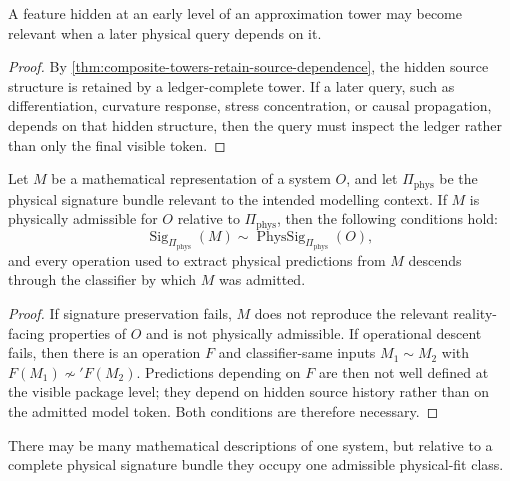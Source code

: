 \begin{corollary}
\label{cor:hidden-source-structure-physically-active}
A feature hidden at an early level of an approximation tower may become relevant when a later physical query depends on it.
\end{corollary}

\begin{proof}
By \autoref{thm:composite-towers-retain-source-dependence}, the hidden source structure is retained by a ledger-complete tower. If a later query, such as differentiation, curvature response, stress concentration, or causal propagation, depends on that hidden structure, then the query must inspect the ledger rather than only the final visible token.
\end{proof}

\begin{theorem}
\label{thm:physical-admissibility-signature-descent}
Let $M$ be a mathematical representation of a system $O$, and let $\Pi_{\mathrm{phys}}$ be the physical signature bundle relevant to the intended modelling context. If $M$ is physically admissible for $O$ relative to $\Pi_{\mathrm{phys}}$, then the following conditions hold:
$$
\operatorname{Sig}_{\Pi_{\mathrm{phys}}}(M)
\sim
\operatorname{PhysSig}_{\Pi_{\mathrm{phys}}}(O),
$$
and every operation used to extract physical predictions from $M$ descends through the classifier by which $M$ was admitted.
\end{theorem}

\begin{proof}
If signature preservation fails, $M$ does not reproduce the relevant reality-facing properties of $O$ and is not physically admissible. If operational descent fails, then there is an operation $F$ and classifier-same inputs $M_1\sim M_2$ with $F(M_1)\not\sim'F(M_2)$. Predictions depending on $F$ are then not well defined at the visible package level; they depend on hidden source history rather than on the admitted model token. Both conditions are therefore necessary.
\end{proof}

\begin{corollary}
\label{cor:physical-representation-unique-up-to-fit}
There may be many mathematical descriptions of one system, but relative to a complete physical signature bundle they occupy one admissible physical-fit class.
\end{corollary}

